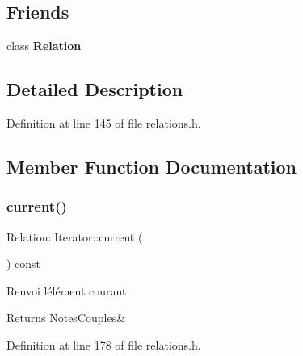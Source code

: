 \subsection*{Friends}
\begin{DoxyCompactItemize}
\item 
\mbox{\label{class_relation_1_1_iterator_a7ee004262f27f8c916688911a71e3aa1}} 
class {\bfseries Relation}
\end{DoxyCompactItemize}


\subsection{Detailed Description}


Definition at line 145 of file relations.\+h.



\subsection{Member Function Documentation}
\mbox{\label{class_relation_1_1_iterator_ae790f3731aad304b3930fb23fa5b9c7c}} 
\subsubsection{\texorpdfstring{current()}{current()}}
{\footnotesize\ttfamily Relation\+::\+Iterator\+::current (\begin{DoxyParamCaption}{ }\end{DoxyParamCaption}) const\hspace{0.3cm}{\ttfamily [inline]}}



Renvoi l\textquotesingle{}élément courant. 

\begin{DoxyReturn}{Returns}
Notes\+Couples\& 
\end{DoxyReturn}


Definition at line 178 of file relations.\+h.


